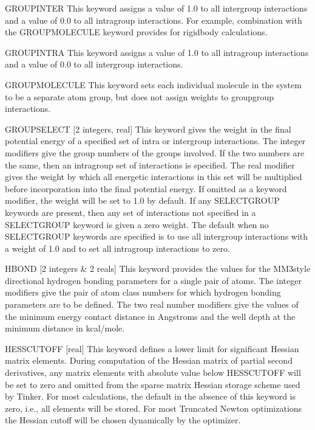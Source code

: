 \documentclass[letterpaper,11pt,english]{sphinxmanual}
\begin{document}
GROUP\sphinxhyphen{}INTER     This keyword assigns a value of 1.0 to all inter\sphinxhyphen{}group interactions and a value of 0.0 to all intra\sphinxhyphen{}group interactions. For example, combination with the GROUP\sphinxhyphen{}MOLECULE keyword provides for rigid\sphinxhyphen{}body calculations.

GROUP\sphinxhyphen{}INTRA     This keyword assigns a value of 1.0 to all intra\sphinxhyphen{}group interactions and a value of 0.0 to all inter\sphinxhyphen{}group interactions.

GROUP\sphinxhyphen{}MOLECULE     This keyword sets each individual molecule in the system to be a separate atom group, but does not assign weights to group\sphinxhyphen{}group interactions.

GROUP\sphinxhyphen{}SELECT {[}2 integers, real{]}     This keyword gives the weight in the final potential energy of a specified set of intra\sphinxhyphen{} or intergroup interactions. The integer modifiers give the group numbers of the groups involved. If the two numbers are the same, then an intragroup set of interactions is specified. The real modifier gives the weight by which all energetic interactions in this set will be multiplied before incorporation into the final potential energy. If omitted as a keyword modifier, the weight will be set to 1.0 by default. If any SELECT\sphinxhyphen{}GROUP keywords are present, then any set of interactions not specified in a SELECT\sphinxhyphen{}GROUP keyword is given a zero weight. The default when no SELECT\sphinxhyphen{}GROUP keywords are specified is to use all intergroup interactions with a weight of 1.0 and to set all intragroup interactions to zero.

HBOND {[}2 integers \& 2 reals{]}     This keyword provides the values for the MM3\sphinxhyphen{}style directional hydrogen bonding parameters for a single pair of atoms. The integer modifiers give the pair of atom class numbers for which hydrogen bonding parameters are to be defined. The two real number modifiers give the values of the minimum energy contact distance in Angstroms and the well depth at the minimum distance in kcal/mole.

HESS\sphinxhyphen{}CUTOFF {[}real{]}     This keyword defines a lower limit for significant Hessian matrix elements. During computation of the Hessian matrix of partial second derivatives, any matrix elements with absolute value below HESS\sphinxhyphen{}CUTOFF will be set to zero and omitted from the sparse matrix Hessian storage scheme used by Tinker. For most calculations, the default in the absence of this keyword is zero, i.e., all elements will be stored. For most Truncated Newton optimizations the Hessian cutoff will be chosen dynamically by the optimizer.
\end{document}
